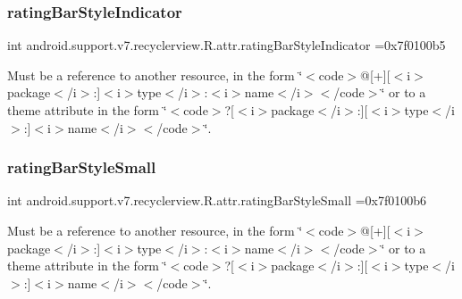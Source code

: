 \subsubsection{\texorpdfstring{rating\+Bar\+Style\+Indicator}{ratingBarStyleIndicator}}
{\footnotesize\ttfamily int android.\+support.\+v7.\+recyclerview.\+R.\+attr.\+rating\+Bar\+Style\+Indicator =0x7f0100b5\hspace{0.3cm}{\ttfamily [static]}}

Must be a reference to another resource, in the form \char`\"{}$<$code$>$@\mbox{[}+\mbox{]}\mbox{[}$<$i$>$package$<$/i$>$\+:\mbox{]}$<$i$>$type$<$/i$>$\+:$<$i$>$name$<$/i$>$$<$/code$>$\char`\"{} or to a theme attribute in the form \char`\"{}$<$code$>$?\mbox{[}$<$i$>$package$<$/i$>$\+:\mbox{]}\mbox{[}$<$i$>$type$<$/i$>$\+:\mbox{]}$<$i$>$name$<$/i$>$$<$/code$>$\char`\"{}. \mbox{\label{classandroid_1_1support_1_1v7_1_1recyclerview_1_1R_1_1attr_af6f8659da5c1e8e0b300ee3a136df987}} 
\subsubsection{\texorpdfstring{rating\+Bar\+Style\+Small}{ratingBarStyleSmall}}
{\footnotesize\ttfamily int android.\+support.\+v7.\+recyclerview.\+R.\+attr.\+rating\+Bar\+Style\+Small =0x7f0100b6\hspace{0.3cm}{\ttfamily [static]}}

Must be a reference to another resource, in the form \char`\"{}$<$code$>$@\mbox{[}+\mbox{]}\mbox{[}$<$i$>$package$<$/i$>$\+:\mbox{]}$<$i$>$type$<$/i$>$\+:$<$i$>$name$<$/i$>$$<$/code$>$\char`\"{} or to a theme attribute in the form \char`\"{}$<$code$>$?\mbox{[}$<$i$>$package$<$/i$>$\+:\mbox{]}\mbox{[}$<$i$>$type$<$/i$>$\+:\mbox{]}$<$i$>$name$<$/i$>$$<$/code$>$\char`\"{}. \mbox{\label{classandroid_1_1support_1_1v7_1_1recyclerview_1_1R_1_1attr_a8dbb6d447b1211e029c76c2ad9424658}} 
